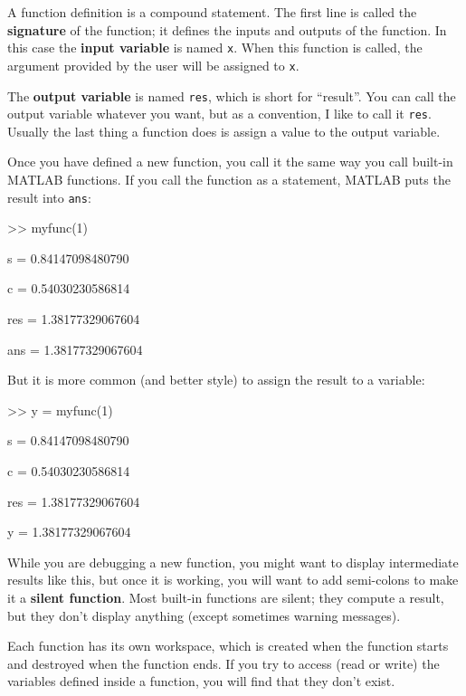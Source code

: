 \documentclass[
]{book}
\numberwithin{Answer}{chapter}
\numberwithin{Exercise}{chapter}
\begin{document}
A function definition is a compound statement.  The first line
is called the {\bf signature} of the function; it defines
the inputs and outputs of the function.  In this case the {\bf input variable} is named {\tt x}.  When this function is called, the
argument provided by the user will be assigned to {\tt x}.



The {\bf output variable} is named {\tt res}, which is short for
``result''.  You can call the output variable whatever you want, but
as a convention, I like to call it {\tt res}.  Usually the last
thing a function does is assign a value to the output variable.


Once you have defined a new function, you call it the same way you
call built-in MATLAB functions.  If you call the function as a statement,
MATLAB puts the result into {\tt ans}:

\begin{code}
>> myfunc(1)

s = 0.84147098480790

c = 0.54030230586814

res = 1.38177329067604

ans = 1.38177329067604
\end{code}

But it is more common (and better style) to assign the result to
a variable:

\begin{code}
>> y = myfunc(1)

s = 0.84147098480790

c = 0.54030230586814

res = 1.38177329067604

y = 1.38177329067604
\end{code}

While you are debugging a new function, you might want to display
intermediate results like this, but once it is working, you will want
to add semi-colons to make it a {\bf silent function}.  Most built-in
functions are silent; they compute a result, but they don't display
anything (except sometimes warning messages).


Each function has its own workspace, which is created when the
function starts and destroyed when the function ends.  If you try to
access (read or write) the variables defined inside a function, you
will find that they don't exist.
\end{document}
